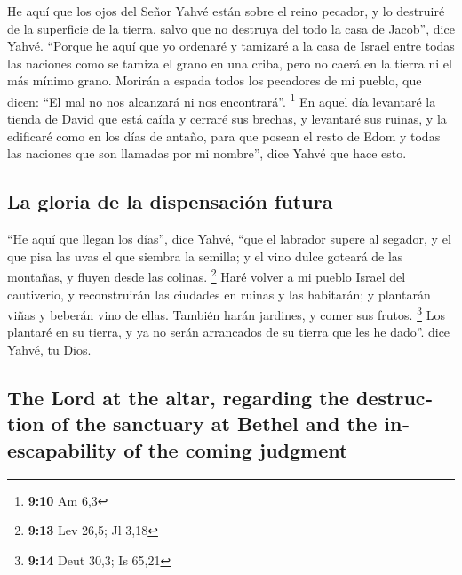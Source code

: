 \begin{paracol}{2}
 He aquí que los ojos del Señor Yahvé están sobre el reino
pecador, y lo destruiré de la superficie de la tierra, salvo que no
destruya del todo la casa de Jacob'', dice Yahvé. 
``Porque he aquí que yo ordenaré y tamizaré a la casa de Israel entre
todas las naciones como se tamiza el grano en una criba, pero no caerá
en la tierra ni el más mínimo grano.  Morirán a espada
todos los pecadores de mi pueblo, que dicen: ``El mal no nos alcanzará
ni nos encontrará''. \footnote{\textbf{9:10} Am 6,3}  En
aquel día levantaré la tienda de David que está caída y cerraré sus
brechas, y levantaré sus ruinas, y la edificaré como en los días de
antaño,  para que posean el resto de Edom y todas las
naciones que son llamadas por mi nombre'', dice Yahvé que hace esto.

\hypertarget{la-gloria-de-la-dispensaciuxf3n-futura}{%
\subsection{La gloria de la dispensación
futura}\label{la-gloria-de-la-dispensaciuxf3n-futura}}

 ``He aquí que llegan los días'', dice Yahvé, ``que el
labrador supere al segador, y el que pisa las uvas el que siembra la
semilla; y el vino dulce goteará de las montañas, y fluyen desde las
colinas. \footnote{\textbf{9:13} Lev 26,5; Jl 3,18}  Haré
volver a mi pueblo Israel del cautiverio, y reconstruirán las ciudades
en ruinas y las habitarán; y plantarán viñas y beberán vino de ellas.
También harán jardines, y comer sus frutos. \footnote{\textbf{9:14} Deut
  30,3; Is 65,21}  Los plantaré en su tierra, y ya no
serán arrancados de su tierra que les he dado''. dice Yahvé, tu Dios.
\switchcolumn \begin{otherlanguage}{english}

\hypertarget{the-lord-at-the-altar-regarding-the-destruction-of-the-sanctuary-at-bethel-and-the-inescapability-of-the-coming-judgment}{%
\subsection{The Lord at the altar, regarding the destruction of the
sanctuary at Bethel and the inescapability of the coming
judgment}\label{the-lord-at-the-altar-regarding-the-destruction-of-the-sanctuary-at-bethel-and-the-inescapability-of-the-coming-judgment}}

\hypertarget{section-17}{%
}
\end{otherlanguage}
\end{paracol}
